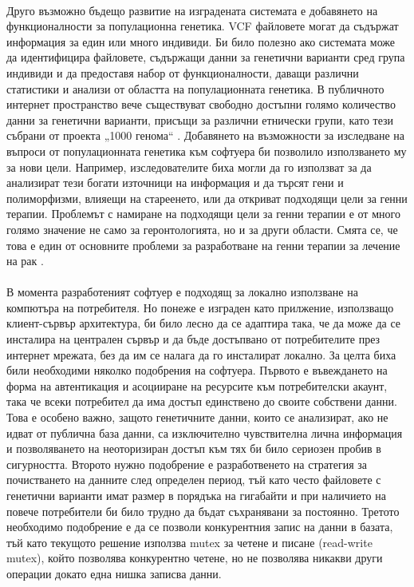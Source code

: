 \documentclass[pdftex,cyrillic,14pt,a4page,twoside,openright]{extreport}
\begin{document}
\paragraph{}
Друго възможно бъдещо развитие на изградената системата е добавянето на функционалности за популационна генетика. VCF файловете могат да съдържат информация за един или много индивиди. Би било полезно ако системата може да идентифицира файловете, съдържащи данни за генетични варианти сред група индивиди и да предоставя набор от функционалности, даващи различни статистики и анализи от областта на популационната генетика. В публичното интернет пространство вече съществуват свободно достъпни голямо количество данни за генетични варианти, присъщи за различни етнически групи, като тези събрани от проекта „1000 генома“ \cite{clarke2012}. Добавянето на възможности за изследване на въпроси от популационната генетика към софтуера би позволило използването му за нови цели. Например, изследователите биха могли да го използват за да анализират тези богати източници на информация и да търсят гени и полиморфизми, влияещи на стареенето, или да откриват подходящи цели за генни терапии. Проблемът с намиране на подходящи цели за генни терапии е от много голямо значение не само за геронтологията, но и за други области. Смята се, че това е един от основните проблеми за разработване на генни терапии за лечение на рак \cite{rosenberg2014}.

\paragraph{}
В момента разработеният софтуер е подходящ за локално използване на компютъра на потребителя. Но понеже е изграден като прилжение, използващо клиент-сървър архитектура, би било лесно да се адаптира така, че да може да се инсталира на централен сървър и да бъде достъпвано от потребителите през интернет мрежата, без да им се налага да го инсталират локално. За целта биха били необходими няколко подобрения на софтуера. Първото е въвеждането на форма на автентикация и асоцииране на ресурсите към потребителски акаунт, така че всеки потребител да има достъп единствено до своите собствени данни. Това е особено важно, защото генетичните данни, които се анализират, ако не идват от публична база данни, са изключително чувствителна лична информация и позволяването на неоторизиран достъп към тях би било сериозен пробив в сигурността. Второто нужно подобрение е разработвенето на стратегия за почистването на данните след определен период, тъй като често файловете с генетични варианти имат размер в порядъка на гигабайти и при наличието на повече потребители би било трудно да бъдат съхранявани за постоянно. Третото необходимо подобрение е да се позволи конкурентния запис на данни в базата, тъй като текущото решение използва mutex за четене и писане (read-write mutex), който позволява конкурентно четене, но не позволява никакви други операции докато една нишка записва данни.
\end{document}
